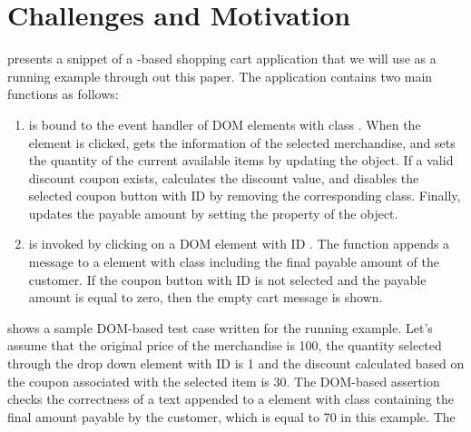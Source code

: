 \section{Challenges and Motivation} \label{Sec:motivation}
 presents a snippet of a \javascript-based shopping cart application that we will use as a running example through out this paper. The application contains two main functions as follows:
\begin{enumerate}
\item {} is bound to the event handler of DOM elements with class . When the element is clicked,  gets the information of the selected merchandise, and sets the quantity of the current available items by updating the  object. If a valid discount coupon exists,  calculates the discount value, and disables the selected  coupon button with ID  by removing the corresponding class. Finally,  updates the payable amount by setting the  property of the  object.
\item {} is invoked by clicking on a DOM element with ID . The function appends a message to a  element with class  including the final payable amount of the customer. If the  coupon button with ID  is not selected and the payable amount is equal to zero, then the empty cart message is shown.    
\end{enumerate}
 shows a sample DOM-based \selenium test case written for the running example. Let's assume that the original price of the merchandise is 100, the quantity selected through the drop down element with ID  is 1 and the discount calculated based on the coupon associated with the selected item is 30. 
The DOM-based assertion checks the correctness of a text appended to a  element with class  containing the final amount payable by the customer, which is equal to 70 in this example.
The 
%
%
%
